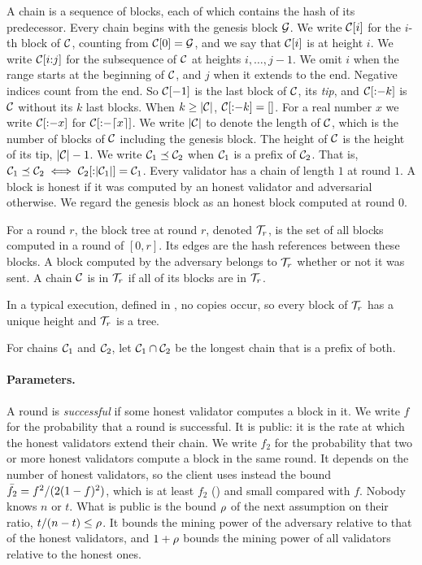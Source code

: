 A chain is a sequence of blocks, each of which contains the hash of its
predecessor. Every chain begins with the genesis block $\mathcal{G}$. We write $\mathcal{C}[i]$
for the $i$-th block of $\mathcal{C}$, counting from $\mathcal{C}[0]=\mathcal{G}$, and we say that
$\mathcal{C}[i]$ is at height $i$. We write $\mathcal{C}[i{:}j]$ for the subsequence of $\mathcal{C}$ at
heights $i,\dots,j-1$. We omit $i$ when the range starts at the beginning of
$\mathcal{C}$, and $j$ when it extends to the end. Negative indices count from the end.
So $\mathcal{C}[{-}1]$ is the last block of $\mathcal{C}$, its \emph{tip}, and $\mathcal{C}[{:}{-}k]$
is $\mathcal{C}$ without its $k$ last blocks. When $k\ge\lvert \mathcal{C}\rvert$, $\mathcal{C}[{:}{-}k]=[]$.
For a real number $x$ we write $\mathcal{C}[{:}{-}x]$ for $\mathcal{C}[{:}{-}\lceil
x\rceil]$. We write $\lvert \mathcal{C}\rvert$ to denote the length of $\mathcal{C}$, which is the
number of blocks of $\mathcal{C}$ including the genesis block. The height of $\mathcal{C}$ is
the height of its tip, $\lvert \mathcal{C}\rvert-1$. We write $\mathcal{C}_1\preceq\mathcal{C}_2$ when $\mathcal{C}_1$
is a prefix of $\mathcal{C}_2$.  That is, $\mathcal{C}_1 \preceq \mathcal{C}_2 \iff
\mathcal{C}_2[{:}\lvert \mathcal{C}_1\rvert] = \mathcal{C}_1$. Every validator has a chain of length $1$ at
round $1$. A block is honest if it was computed by an honest validator and
adversarial otherwise. We regard the genesis block as an honest block computed
at round $0$.

\begin{definition}\label{def.tree}
    For a round $r$, the block tree at round $r$, denoted $\mathcal{T}_r$, is the set of
    all blocks computed in a round of $[0,r]$. Its edges are the hash references between
    these blocks. A block computed by the adversary belongs to $\mathcal{T}_r$ whether or
    not it was sent. A chain $\mathcal{C}$ is in $\mathcal{T}_r$ if all of its blocks are in
    $\mathcal{T}_r$.
\end{definition}

In a typical execution, defined in , no copies occur, so every block of
$\mathcal{T}_r$ has a unique height and $\mathcal{T}_r$ is a tree.

\begin{definition}\label{def.meet}
    For chains $\mathcal{C}_1$ and $\mathcal{C}_2$, let $\mathcal{C}_1\cap\mathcal{C}_2$ be the longest chain
    that is a prefix of both.
\end{definition}

\paragraph{Parameters.}

A round is \emph{successful} if some honest validator computes a block in it.
We write $f$ for the probability that a round is successful. It is public: it
is the rate at which the honest validators extend their chain. We write $f_2$
for the probability that two or more honest validators compute a block in the
same round. It depends on the number of honest validators, so the client uses
instead the bound $\bar{f}_2=f^2/(2(1-f)^2)$, which is at least $f_2$
() and small compared with $f$. Nobody knows $n$ or $t$. What is
public is the bound $\rho$ of the next assumption on their ratio,
$t/(n-t)\le\rho$. It bounds the mining power of the adversary relative to that
of the honest validators, and $1+\rho$ bounds the mining power of all
validators relative to the honest ones.

